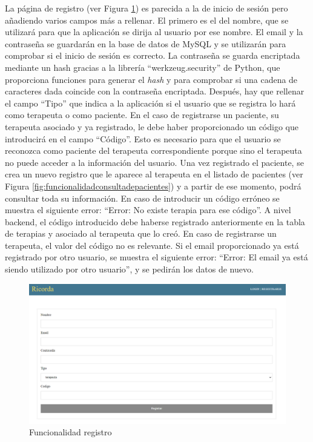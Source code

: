La página de registro (ver Figura \ref{fig:funcionalidadsignin}) es parecida a la de inicio de sesión pero añadiendo varios campos más a rellenar. El primero es el del nombre, que se utilizará para que la aplicación se dirija al usuario por ese nombre. El email y la contraseña se guardarán en la base de datos de MySQL y se utilizarán para comprobar si el inicio de sesión es correcto. La contraseña se guarda encriptada mediante un hash gracias a la librería ``werkzeug.security'' de Python, que proporciona funciones para generar el \textit{hash} y para comprobar si una cadena de caracteres dada coincide con la contraseña encriptada. Después, hay que rellenar el campo ``Tipo'' que indica a la aplicación si el usuario que se registra lo hará como terapeuta o como paciente. En el caso de registrarse un paciente, su terapeuta asociado y ya registrado, le debe haber proporcionado un código que introducirá en el campo ``Código''. Esto es necesario para que el usuario se reconozca como paciente del terapeuta correspondiente porque sino el terapeuta no puede acceder a la información del usuario. Una vez registrado el paciente, se crea un nuevo registro que le aparece al terapeuta en el listado de pacientes (ver Figura \ref{fig:funcionalidadconsultadepacientes}) y a partir de ese momento, podrá consultar toda su información. En caso de introducir un código erróneo se muestra el siguiente error: ``Error: No existe terapia para ese código''. A nivel backend, el código introducido debe haberse registrado anteriormente en la tabla de terapias y asociado al terapeuta que lo creó. En caso de registrarse un terapeuta, el valor del código no es relevante. Si el email proporcionado ya está registrado por otro usuario, se muestra el siguiente error: ``Error: El email ya está siendo utilizado por otro usuario'', y se pedirán los datos de nuevo.

\begin{figure}[h]
	\centering
	\includegraphics[scale=0.5]{Imagenes/Vectorial/funcionalidad_signin}
	\caption{Funcionalidad registro}
	\label{fig:funcionalidadsignin}
\end{figure}

